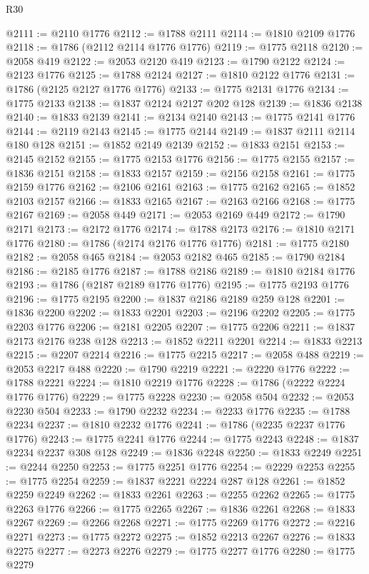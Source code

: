 \begin{lexlean}{R30}
\begin{coremodule}
@2111 := @2110 @1776
@2112 := @1788 @2111
@2114 := @1810 @2109 @1776
@2118 := @1786 (@2112 @2114 @1776 @1776)
@2119 := @1775 @2118
@2120 := @2058 @419
@2122 := @2053 @2120 @419
@2123 := @1790 @2122
@2124 := @2123 @1776
@2125 := @1788 @2124
@2127 := @1810 @2122 @1776
@2131 := @1786 (@2125 @2127 @1776 @1776)
@2133 := @1775 @2131 @1776
@2134 := @1775 @2133
@2138 := @1837 @2124 @2127 @202 @128
@2139 := @1836 @2138
@2140 := @1833 @2139
@2141 := @2134 @2140
@2143 := @1775 @2141 @1776
@2144 := @2119 @2143
@2145 := @1775 @2144
@2149 := @1837 @2111 @2114 @180 @128
@2151 := @1852 @2149 @2139
@2152 := @1833 @2151
@2153 := @2145 @2152
@2155 := @1775 @2153 @1776
@2156 := @1775 @2155
@2157 := @1836 @2151
@2158 := @1833 @2157
@2159 := @2156 @2158
@2161 := @1775 @2159 @1776
@2162 := @2106 @2161
@2163 := @1775 @2162
@2165 := @1852 @2103 @2157
@2166 := @1833 @2165
@2167 := @2163 @2166
@2168 := @1775 @2167
@2169 := @2058 @449
@2171 := @2053 @2169 @449
@2172 := @1790 @2171
@2173 := @2172 @1776
@2174 := @1788 @2173
@2176 := @1810 @2171 @1776
@2180 := @1786 (@2174 @2176 @1776 @1776)
@2181 := @1775 @2180
@2182 := @2058 @465
@2184 := @2053 @2182 @465
@2185 := @1790 @2184
@2186 := @2185 @1776
@2187 := @1788 @2186
@2189 := @1810 @2184 @1776
@2193 := @1786 (@2187 @2189 @1776 @1776)
@2195 := @1775 @2193 @1776
@2196 := @1775 @2195
@2200 := @1837 @2186 @2189 @259 @128
@2201 := @1836 @2200
@2202 := @1833 @2201
@2203 := @2196 @2202
@2205 := @1775 @2203 @1776
@2206 := @2181 @2205
@2207 := @1775 @2206
@2211 := @1837 @2173 @2176 @238 @128
@2213 := @1852 @2211 @2201
@2214 := @1833 @2213
@2215 := @2207 @2214
@2216 := @1775 @2215
@2217 := @2058 @488
@2219 := @2053 @2217 @488
@2220 := @1790 @2219
@2221 := @2220 @1776
@2222 := @1788 @2221
@2224 := @1810 @2219 @1776
@2228 := @1786 (@2222 @2224 @1776 @1776)
@2229 := @1775 @2228
@2230 := @2058 @504
@2232 := @2053 @2230 @504
@2233 := @1790 @2232
@2234 := @2233 @1776
@2235 := @1788 @2234
@2237 := @1810 @2232 @1776
@2241 := @1786 (@2235 @2237 @1776 @1776)
@2243 := @1775 @2241 @1776
@2244 := @1775 @2243
@2248 := @1837 @2234 @2237 @308 @128
@2249 := @1836 @2248
@2250 := @1833 @2249
@2251 := @2244 @2250
@2253 := @1775 @2251 @1776
@2254 := @2229 @2253
@2255 := @1775 @2254
@2259 := @1837 @2221 @2224 @287 @128
@2261 := @1852 @2259 @2249
@2262 := @1833 @2261
@2263 := @2255 @2262
@2265 := @1775 @2263 @1776
@2266 := @1775 @2265
@2267 := @1836 @2261
@2268 := @1833 @2267
@2269 := @2266 @2268
@2271 := @1775 @2269 @1776
@2272 := @2216 @2271
@2273 := @1775 @2272
@2275 := @1852 @2213 @2267
@2276 := @1833 @2275
@2277 := @2273 @2276
@2279 := @1775 @2277 @1776
@2280 := @1775 @2279

\end{coremodule}
\end{lexlean}
